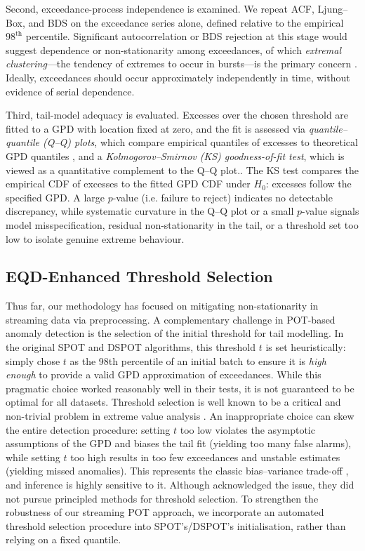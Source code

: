 \documentclass{statsmsc}
\begin{document}
Second, exceedance-process independence is examined. 
We repeat ACF, Ljung--Box, and BDS on the exceedance series alone, defined relative to the empirical 
$98^\mathrm{th}$ percentile. Significant autocorrelation or BDS rejection at this stage would suggest 
dependence or non-stationarity among exceedances, of which \emph{extremal clustering}---the tendency of 
extremes to occur in bursts---is the primary concern \citep{leadbetter1983extremes}. 
Ideally, exceedances should occur approximately independently in time, without evidence of serial dependence.

Third, tail-model adequacy is evaluated.
Excesses over the chosen threshold are fitted to a GPD with location fixed at zero, 
and the fit is assessed via \emph{quantile--quantile (Q--Q) plots}, which compare empirical quantiles of excesses 
to theoretical GPD quantiles \citep{Coles2001}, and a \emph{Kolmogorov--Smirnov (KS) goodness-of-fit test}, which 
is viewed as a quantitative complement to the Q--Q plot.\citep{massey1951kolmogorov}. 
The KS test compares the empirical CDF of excesses to the fitted GPD CDF under $H_0$: excesses follow the specified GPD. 
A large $p$-value (i.e. failure to reject) indicates no detectable discrepancy, while systematic curvature 
in the Q--Q plot or a small $p$-value signals model misspecification, residual non-stationarity in the tail, 
or a threshold set too low to isolate genuine extreme behaviour.

\subsection{EQD-Enhanced Threshold Selection}\label{subsec:eqd}

Thus far, our methodology has focused on mitigating non-stationarity in streaming data via preprocessing. 
A complementary challenge in POT-based anomaly detection is the selection of 
the initial threshold for tail modelling. In the original SPOT and DSPOT algorithms, 
this threshold $t$ is set heuristically: \citet{siffer2017anomaly} simply chose $t$ as the 98th percentile of 
an initial batch to ensure it is \emph{high enough} to provide a valid GPD approximation of exceedances. 
While this pragmatic choice worked reasonably well in their tests, 
it is not guaranteed to be optimal for all datasets. 
Threshold selection is well known to be a critical and non-trivial problem in extreme value analysis 
\citep{Coles2001,DavisonSmith1990}. An inappropriate choice can skew the entire detection procedure: 
setting $t$ too low violates the asymptotic assumptions of the GPD and biases the tail fit (yielding too many false alarms), 
while setting $t$ too high results in too few exceedances and unstable estimates (yielding missed anomalies). 
This represents the classic bias--variance trade-off \citep{NorthropJonathan2011}, and inference is highly sensitive to it. 
Although \citet{siffer2017anomaly} acknowledged the issue, they did not pursue principled methods for threshold selection. 
To strengthen the robustness of our streaming POT approach, 
we incorporate an automated threshold selection procedure into SPOT's/DSPOT’s initialisation, rather than relying on a fixed quantile. 
\end{document}
